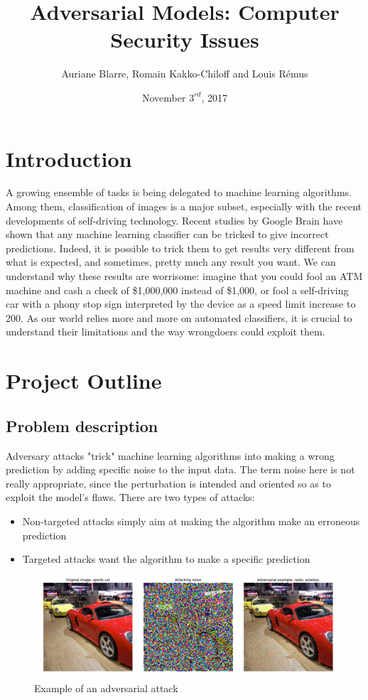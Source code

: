 \documentclass{article}
\title{Adversarial Models: Computer Security Issues}
\author{Auriane Blarre, Romain Kakko-Chiloff and Louis R\'emus}
\date{November $3^{rd}$,  2017}
\begin{document}
\maketitle

\section{Introduction}
A growing ensemble of tasks is being delegated to machine learning algorithms. Among them, classification of images is a major subset, especially with the recent developments of self-driving technology. Recent studies by Google Brain have shown that any machine learning classifier can be tricked to give incorrect predictions. Indeed, it is possible to trick them to get results very different from what is expected, and sometimes, pretty much any result you want.
\newline
We can understand why these results are worrisome: imagine that you could fool an ATM machine and cash a check of \$1,000,000 instead of \$1,000, or fool a self-driving car with a phony stop sign interpreted by the device as a speed limit increase to 200.
As our world relies more and more on automated classifiers, it is crucial to understand their limitations and the way wrongdoers could exploit them.

\section{Project Outline}
\subsection{Problem description}
Adversary attacks "trick" machine learning algorithms into making a wrong prediction by adding specific noise to the input data. The term noise here is not really appropriate, since the perturbation is intended and oriented so as to exploit the model's flaws.
\newline
There are two types of attacks:

\begin{itemize}
    \item Non-targeted attacks simply aim at making the algorithm make an erroneous prediction
    \item Targeted attacks want the algorithm to make a specific prediction
\end{itemize}

\begin{figure}[ht]
\includegraphics[width=\textwidth]{fig/adversarial_example_car.png}
\centering
\caption{Example of an adversarial attack}
\end{figure}
\end{document}
